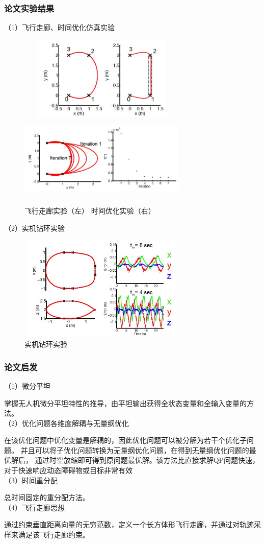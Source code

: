 \subsubsection{论文实验结果}
（1）飞行走廊、时间优化仿真实验
\begin{figure}[htbp]
    \centering
    \includegraphics[width=8cm, height=4cm]{image/minimumSnap1.jpg}
    \includegraphics[width=8cm, height=4cm]{image/minimumSnap2.jpg}
    \caption{飞行走廊实验（左）  时间优化实验（右）}\label{snap1}
\end{figure}



（2）实机钻环实验
\begin{figure}[htbp]
    \centering
    \includegraphics[width=8cm, height=5cm]{image/minimumSnap3.jpg}
    \caption{实机钻环实验}\label{snap3}
\end{figure}

\subsubsection{论文启发}（1）微分平坦


掌握无人机微分平坦特性的推导，由平坦输出获得全状态变量和全输入变量的方法。\\
（2）优化问题各维度解耦与无量纲优化


在该优化问题中优化变量是解耦的，因此优化问题可以被分解为若干个优化子问题。
并且可以将子优化问题转换为无量纲优化问题，在得到无量纲优化问题的最优解后，
通过时空放缩即可得到原问题最优解。该方法比直接求解QP问题快速，对于快速响应动态障碍物或目标非常有效\\
（3）时间重分配


总时间固定的重分配方法。\\
（4）飞行走廊思想


通过约束垂直距离向量的无穷范数，定义一个长方体形飞行走廊，并通过对轨迹采样来满足该飞行走廊约束。